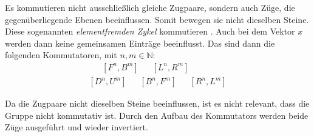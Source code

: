 \documentclass[12pt,a4paper, usenames, dvipsnames]{article}
\theoremstyle{mystyle}
\theoremstyle{definition}
\begin{document}
Es kommutieren nicht ausschließlich gleiche Zugpaare, sondern auch Züge, die gegenüberliegende Ebenen beeinflussen. Somit bewegen sie nicht dieselben Steine. Diese sogenannten \textit{elementfremden Zykel} kommutieren \cite{OS}. Auch bei dem Vektor $x$ werden dann keine gemeinsamen Einträge beeinflusst.
Das sind dann die folgenden Kommutatoren, mit $n, m \in \mathbb{N}$:
\begin{align*}
[U^n, D^m] \ \ \ \  \ \ \ [F^n, B^m] \ \ \ \ \ \ \ [L^n, R^m] \\
[D^n, U^m] \ \ \ \ \ \ \  [B^n, F^m] \ \ \ \ \ \ \ [R^n, L^m] 
\end{align*}

Da die Zugpaare nicht dieselben Steine beeinflussen, ist es nicht relevant, dass die Gruppe nicht kommutativ ist. Durch den Aufbau des Kommutators werden beide Züge ausgeführt und wieder invertiert.
\end{document}
